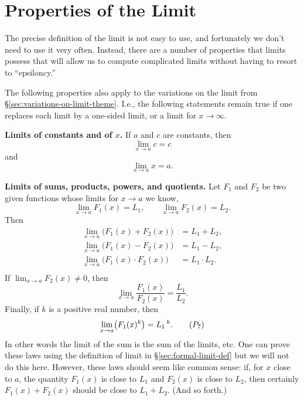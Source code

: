 \section{Properties of the Limit} 
\label{sec:limitProperties}%
The precise definition of the limit is not easy to use, and
fortunately we don't need to use it very often.  Instead, there
are a number of properties that limits possess that will allow us to compute
complicated limits without having to resort to ``epsiloncy.''

The following properties also apply to the variations on the limit from
\S\ref{sec:variations-on-limit-theme}.  I.e., the following statements remain
true if one replaces each limit by a one-sided limit, or a limit for
$x\to\infty$.  \smallskip

\textbf{Limits of constants and of $x$. } If $a$ and $c$ are constants,
then
\begin{equation}
  \lim_{x\to a}c=c \tag{$P_1$}
\end{equation}
and
\begin{equation}
  \lim_{x\to a} x= a.\tag{$P_2$}
\end{equation}

\textbf{Limits of sums, products, powers, and quotients. } Let $F_1$ and $F_2$ be
two given functions whose limits for $x\to a$ we know,
\[
\lim_{x\to a}F_1(x)=L_1, \qquad \lim_{x\to a}F_2(x)=L_2.
\]
Then
\begin{align*}
  \lim_{x\to a}\bigl(F_1(x)+F_2(x)\bigr) &= L_1+L_2, \tag{$P_3$} \\
  \lim_{x\to a}\bigl(F_1(x)-F_2(x)\bigr) &= L_1 - L_2, \tag{$P_4$} \\
  \lim_{x\to a}\bigl(F_1(x)\cdot F_2(x)\bigr) &= L_1\cdot L_2 . \tag{$P_5$} \\
\end{align*}
If $ \lim_{x\to a}F_2(x)\ne0$, then
\begin{equation}
  \lim_{x\to a}\frac{F_1(x)}{F_2(x)}= \frac{L_1}{L_2}.\tag{$P_6$}
\end{equation}
Finally, if $k$ is a positive real number, then
  \begin{equation}
\lim_{x\to a}\bigl(F_1(x)^k\bigr) = L_1\,^k . \tag{$P_{7}$}
  \end{equation}
In other words the limit of the sum is the sum of the limits, etc.  One can
prove these laws using the definition of limit in
\S\ref{sec:formal-limit-def} but we will not do this here.  However, these laws
should seem like common sense: if, for $x$ close to $a$, the quantity
$F_1(x)$ is close to $L_1$ and $F_2(x)$ is close to $L_2$, then certainly
$F_1(x)+F_2(x)$ should be close to $L_1+L_2$. (And so forth.)




